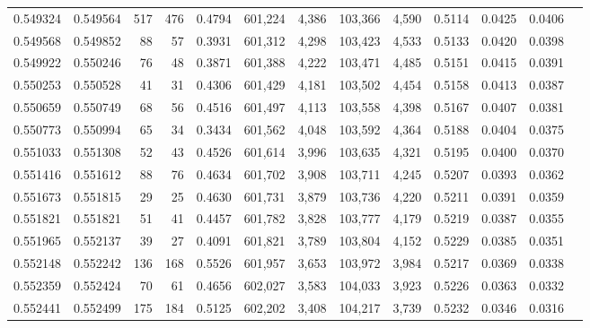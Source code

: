 \begin{tabular}{rrrrrrrrrrrrr}
0.549324 & 0.549564 &   517 &   476 &                                     0.4794 & 601,224 &   4,386 & 103,366 &   4,590 & 0.5114 & 0.0425 & 0.0406 \\
0.549568 & 0.549852 &    88 &    57 &                                     0.3931 & 601,312 &   4,298 & 103,423 &   4,533 & 0.5133 & 0.0420 & 0.0398 \\
0.549922 & 0.550246 &    76 &    48 &                                     0.3871 & 601,388 &   4,222 & 103,471 &   4,485 & 0.5151 & 0.0415 & 0.0391 \\
0.550253 & 0.550528 &    41 &    31 &                                     0.4306 & 601,429 &   4,181 & 103,502 &   4,454 & 0.5158 & 0.0413 & 0.0387 \\
0.550659 & 0.550749 &    68 &    56 &                                     0.4516 & 601,497 &   4,113 & 103,558 &   4,398 & 0.5167 & 0.0407 & 0.0381 \\
0.550773 & 0.550994 &    65 &    34 &                                     0.3434 & 601,562 &   4,048 & 103,592 &   4,364 & 0.5188 & 0.0404 & 0.0375 \\
0.551033 & 0.551308 &    52 &    43 &                                     0.4526 & 601,614 &   3,996 & 103,635 &   4,321 & 0.5195 & 0.0400 & 0.0370 \\
0.551416 & 0.551612 &    88 &    76 &                                     0.4634 & 601,702 &   3,908 & 103,711 &   4,245 & 0.5207 & 0.0393 & 0.0362 \\
0.551673 & 0.551815 &    29 &    25 &                                     0.4630 & 601,731 &   3,879 & 103,736 &   4,220 & 0.5211 & 0.0391 & 0.0359 \\
0.551821 & 0.551821 &    51 &    41 &                                     0.4457 & 601,782 &   3,828 & 103,777 &   4,179 & 0.5219 & 0.0387 & 0.0355 \\
0.551965 & 0.552137 &    39 &    27 &                                     0.4091 & 601,821 &   3,789 & 103,804 &   4,152 & 0.5229 & 0.0385 & 0.0351 \\
0.552148 & 0.552242 &   136 &   168 &                                     0.5526 & 601,957 &   3,653 & 103,972 &   3,984 & 0.5217 & 0.0369 & 0.0338 \\
0.552359 & 0.552424 &    70 &    61 &                                     0.4656 & 602,027 &   3,583 & 104,033 &   3,923 & 0.5226 & 0.0363 & 0.0332 \\
0.552441 & 0.552499 &   175 &   184 &                                     0.5125 & 602,202 &   3,408 & 104,217 &   3,739 & 0.5232 & 0.0346 & 0.0316 \\

\end{tabular}
